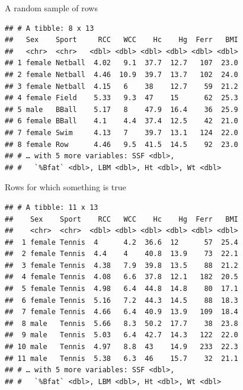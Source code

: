 \documentclass[ignorenonframetext,]{beamer}
\newenvironment{Shaded}{\begin{snugshade}}{\end{snugshade}}
\newcommand{\DecValTok}[1]{\textcolor[rgb]{0.00,0.00,0.81}{#1}}
\newcommand{\KeywordTok}[1]{\textcolor[rgb]{0.13,0.29,0.53}{\textbf{#1}}}
\newcommand{\NormalTok}[1]{#1}
\newcommand{\OperatorTok}[1]{\textcolor[rgb]{0.81,0.36,0.00}{\textbf{#1}}}
\newcommand{\StringTok}[1]{\textcolor[rgb]{0.31,0.60,0.02}{#1}}
\begin{document}
\begin{frame}[fragile]{A random sample of rows}
\protect\hypertarget{a-random-sample-of-rows}{}

\begin{Shaded}
\end{Shaded}

\begin{verbatim}
## # A tibble: 8 x 13
##   Sex    Sport     RCC   WCC    Hc    Hg  Ferr   BMI
##   <chr>  <chr>   <dbl> <dbl> <dbl> <dbl> <dbl> <dbl>
## 1 female Netball  4.02   9.1  37.7  12.7   107  23.0
## 2 female Netball  4.46  10.9  39.7  13.7   102  24.0
## 3 female Netball  4.15   6    38    12.7    59  21.2
## 4 female Field    5.33   9.3  47    15      62  25.3
## 5 male   BBall    5.17   8    47.9  16.4    36  25.9
## 6 female BBall    4.1    4.4  37.4  12.5    42  21.0
## 7 female Swim     4.13   7    39.7  13.1   124  22.0
## 8 female Row      4.46   9.5  41.5  14.5    92  23.0
## # … with 5 more variables: SSF <dbl>,
## #   `%Bfat` <dbl>, LBM <dbl>, Ht <dbl>, Wt <dbl>
\end{verbatim}

\end{frame}

\begin{frame}[fragile]{Rows for which something is true}
\protect\hypertarget{rows-for-which-something-is-true}{}

\begin{Shaded}
\end{Shaded}

\begin{verbatim}
## # A tibble: 11 x 13
##    Sex    Sport    RCC   WCC    Hc    Hg  Ferr   BMI
##    <chr>  <chr>  <dbl> <dbl> <dbl> <dbl> <dbl> <dbl>
##  1 female Tennis  4      4.2  36.6  12      57  25.4
##  2 female Tennis  4.4    4    40.8  13.9    73  22.1
##  3 female Tennis  4.38   7.9  39.8  13.5    88  21.2
##  4 female Tennis  4.08   6.6  37.8  12.1   182  20.5
##  5 female Tennis  4.98   6.4  44.8  14.8    80  17.1
##  6 female Tennis  5.16   7.2  44.3  14.5    88  18.3
##  7 female Tennis  4.66   6.4  40.9  13.9   109  18.4
##  8 male   Tennis  5.66   8.3  50.2  17.7    38  23.8
##  9 male   Tennis  5.03   6.4  42.7  14.3   122  22.0
## 10 male   Tennis  4.97   8.8  43    14.9   233  22.3
## 11 male   Tennis  5.38   6.3  46    15.7    32  21.1
## # … with 5 more variables: SSF <dbl>,
## #   `%Bfat` <dbl>, LBM <dbl>, Ht <dbl>, Wt <dbl>
\end{verbatim}

\end{frame}
\end{document}
